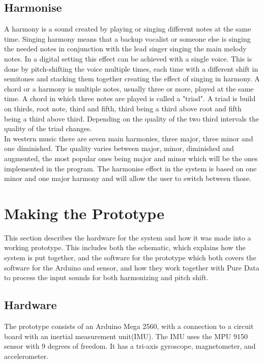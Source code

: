 \subsection{Harmonise}

A harmony is a sound created by playing or singing different notes at the same time\citep{Harmonise02}.
Singing harmony means that a backup vocalist or someone else is singing the needed notes in conjunction with the lead singer singing the main melody notes. In a digital setting this effect can be achieved with a single voice. This is done by pitch-shifting the voice multiple times, each time with a different shift in semitones and stacking them together creating the effect of singing in harmony. 
A chord or a harmony is multiple notes, usually three or more, played at the same time. A chord in which three notes are played is called a "triad"\citep{Harmonise01}. A triad is build on thirds,  root note, third and fifth, third being a third above root and fifth being a third above third. Depending on the quality of the two third intervals the quality of the triad changes. \\
In western music there are seven main harmonies, three major, three minor and one diminished. The quality varies between major, minor, diminished and augmented, the most popular ones being major and minor which will be the ones implemented in the program. The harmonise effect in the system is based on one minor and one major harmony and will allow the user to switch between those.

\section{Making the Prototype}

This section describes the hardware for the system and how it was made into a working prototype. This includes both the schematic, which explains how the system is put together, and the software for the prototype which both covers the software for the Arduino and sensor, and how they work together with Pure Data to process the input sounds for both harmonizing and pitch shift.

\subsection{Hardware}

The prototype consists of an Arduino Mega 2560\citep{Arduino}, with a connection to a circuit board with an inertial measurement unit(IMU). 
The IMU uses the MPU 9150 sensor with 9 degrees of freedom\citep{MPU}. It has a tri-axis gyroscope, magnetometer, and accelerometer.
